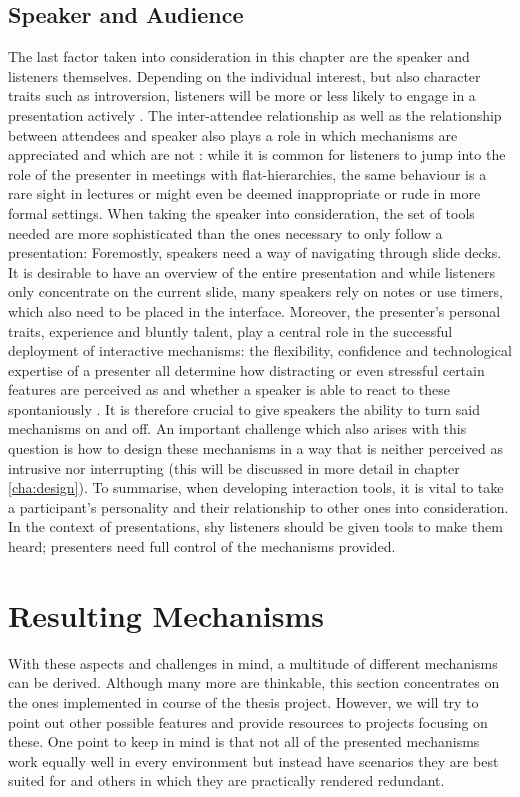 \subsection{Speaker and Audience}
The last factor taken into consideration in this chapter are the speaker and listeners themselves. Depending on the individual interest, but also character traits such as introversion, listeners will be more or less likely to engage in a presentation actively \cite{Bry:Backstage}. The inter-attendee relationship as well as the relationship between attendees and speaker also plays a role in which mechanisms are appreciated and which are not \cite{Moore:ThreeTypesOfInteraction}: while it is common for listeners to jump into the role of the presenter in meetings with flat-hierarchies, the same behaviour is a rare sight in lectures or might even be deemed inappropriate or rude in more formal settings. When taking the speaker into consideration, the set of tools needed are more sophisticated than the ones necessary to only follow a presentation: Foremostly, speakers need a way of navigating through slide decks. It is desirable to have an overview of the entire presentation and while listeners only concentrate on the current slide, many speakers rely on notes or use timers, which also need to be placed in the interface.
Moreover, the presenter's personal traits, experience and bluntly talent, play a central role in the successful deployment of interactive mechanisms: the flexibility, confidence and technological expertise of a presenter all determine how distracting or even stressful certain features are perceived as and whether a speaker is able to react to these spontaniously \cite{Wacker:PresenterExperience}. It is therefore crucial to give speakers the ability to turn said mechanisms on and off. An important challenge which also arises with this question is how to design these mechanisms in a way that is neither perceived as intrusive nor interrupting (this will be discussed in more detail in chapter \ref{cha:design}).
To summarise, when developing interaction tools, it is vital to take a participant's personality and their relationship to other ones into consideration. In the context of presentations, shy listeners should be given tools to make them heard; presenters need full control of the mechanisms provided.

\section{Resulting Mechanisms}
With these aspects and challenges in mind, a multitude of different mechanisms can be derived. Although many more are thinkable, this section concentrates on the ones implemented in course of the thesis project. However, we will try to point out other possible features and provide resources to projects focusing on these. One point to keep in mind is that not all of the presented mechanisms work equally well in every environment but instead have scenarios they are best suited for and others in which they are practically rendered redundant.

